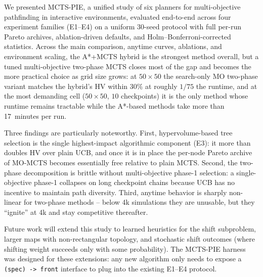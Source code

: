 We presented MCTS-PIE, a unified study of six planners for multi-objective pathfinding in interactive environments, evaluated end-to-end across four experiment families (E1--E4) on a uniform 30-seed protocol with full per-run Pareto archives, ablation-driven defaults, and Holm--Bonferroni-corrected statistics. Across the main comparison, anytime curves, ablations, and environment scaling, the A*+MCTS hybrid is the strongest method overall, but a tuned multi-objective two-phase MCTS closes most of the gap and becomes the more practical choice as grid size grows: at $50 \times 50$ the search-only MO two-phase variant matches the hybrid's HV within $30\%$ at roughly $1/75$ the runtime, and at the most demanding cell ($50 \times 50$, $10$ checkpoints) it is the only method whose runtime remains tractable while the A*-based methods take more than 17~minutes per run.

Three findings are particularly noteworthy. First, hypervolume-based tree selection is the single highest-impact algorithmic component (E3): it more than doubles HV over plain UCB, and once it is in place the per-node Pareto archive of MO-MCTS becomes essentially free relative to plain MCTS. Second, the two-phase decomposition is brittle without multi-objective phase-1 selection: a single-objective phase-1 collapses on long checkpoint chains because UCB has no incentive to maintain path diversity. Third, anytime behavior is sharply non-linear for two-phase methods -- below 4k simulations they are unusable, but they ``ignite'' at 4k and stay competitive thereafter.

Future work will extend this study to learned heuristics for the shift subproblem, larger maps with non-rectangular topology, and stochastic shift outcomes (where shifting weight succeeds only with some probability). The MCTS-PIE harness was designed for these extensions: any new algorithm only needs to expose a \texttt{(spec) -> front} interface to plug into the existing E1--E4 protocol.
